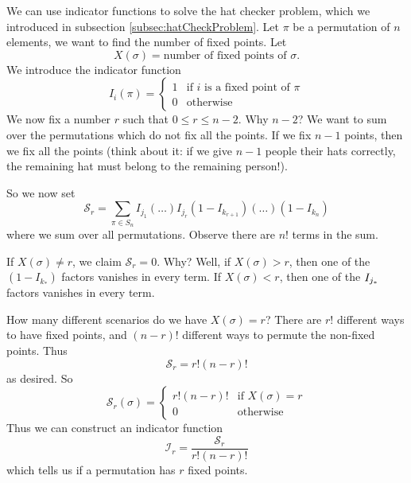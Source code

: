 We can use indicator functions to solve the hat checker problem, which we 
introduced in subsection \ref{subsec:hatCheckProblem}. Let $\pi$ be a 
permutation of $n$ elements, we want to find the number of fixed points. Let
\begin{equation}
X(\sigma)=\mbox{number of fixed points of $\sigma$}.
\end{equation}
We introduce the indicator function
\begin{equation}
I_{i}(\pi) = \begin{cases}
1 & \mbox{if $i$ is a fixed point of $\pi$}\\
0 & \mbox{otherwise}
\end{cases}
\end{equation}
We now fix a number $r$ such that $0\leq r\leq n-2$. Why $n-2$? We want to
sum over the permutations which do not fix all the points. If we fix $n-1$ points,
then we fix all the points (think about it: if we give $n-1$ people their hats 
correctly, the remaining hat must belong to the remaining person!). 

So we now set
\begin{equation}
\mathcal{S}_{r}=\sum_{\pi\in S_{n}}I_{j_1}(\dots)I_{j_r}(1-I_{k_{r+1}})%
(\dots)(1-I_{k_{n}})
\end{equation}
where we sum over all permutations. Observe there are $n!$ terms in the sum.

If $X(\sigma)\neq r$, we claim $\mathcal{S}_{r}=0$. Why? Well, if 
$X(\sigma)>r$, then one of the $(1-I_{k_{\textstyle{*}}})$ factors vanishes
in every term. If $X(\sigma)<r$, then one of the $I_{j_{\normalsize *}}$ factors
vanishes in every term. 

How many different scenarios do we have $X(\sigma)=r$? There are $r!$
different ways to have fixed points, and $(n-r)!$ different ways to permute
the non-fixed points. Thus
\begin{equation}
\mathcal{S}_{r}=r!(n-r)!
\end{equation}
as desired. So
\begin{equation}
\mathcal{S}_{r}(\sigma) = \begin{cases}r!(n-r)! & \mbox{if $X(\sigma)=r$}\\
0 & \mbox{otherwise}\end{cases}
\end{equation}
Thus we can construct an indicator function
\begin{equation}
\mathcal{I}_{r}=\frac{\mathcal{S}_{r}}{r!(n-r)!}
\end{equation}
which tells us if a permutation has $r$ fixed points.

